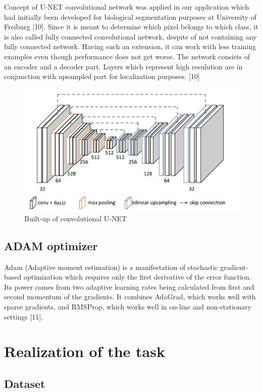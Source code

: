 \documentclass{article}
\begin{document}
Concept of U-NET convolutional network was applied in our application which had initially been developed for biological segmentation purposes at University of Freiburg [10]. Since it is meant to determine which pixel belongs to which class, it is also called fully connected convolutional network, despite of not containing any fully connected network. Having such an extension, it can work with less training examples even though performance does not get worse. The network consists of an encoder and a decoder part. Layers which represent high  resulution are in conjunction with upsampled part for localization purposes. [10]

\begin{figure}
	\includegraphics[scale = 0.7]{images/unet}
	\centering
	\caption{Built-up of convolutional U-NET}
\end{figure}

\subsection{ADAM optimizer}
Adam (Adaptive moment estimation) is a manifestation of stochastic gradient-based optimization which requires only the first derivative of the error function. Its power comes from two adaptive learning rates being calculated from first and second momentum of the gradients. It combines AdaGrad, which works well with sparse gradients, and RMSProp, which works well in on-line and non-stationary settings [11].


\section{Realization of the task}
\subsection{Dataset}
\end{document}
